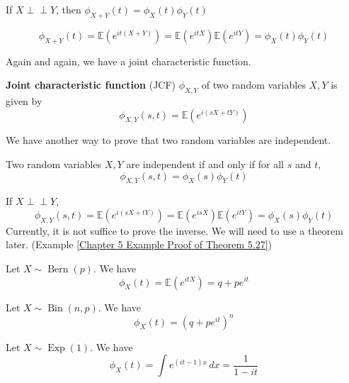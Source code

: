 \documentclass{huhtakm-template-book}
\newcommand{\independent}{\perp\!\!\!\perp}
\newcommand{\expect}{\mathbb{E}}
\DeclareMathOperator{\Bern}{Bern}
\DeclareMathOperator{\Bin}{Bin}
\DeclareMathOperator{\Exp}{Exp}
\begin{document}
\begin{thm}
    If $X\independent Y$, then $\phi_{X+Y}(t)=\phi_{X}(t)\phi_{Y}(t)$
\end{thm}
\begin{proofing}
    \begin{equation*}
        \phi_{X+Y}(t)=\expect(e^{it(X+Y)})=\expect(e^{itX})\expect(e^{itY})=\phi_{X}(t)\phi_{Y}(t)
    \end{equation*}
\end{proofing}
Again and again, we have a joint characteristic function.
\begin{defn}
    \textbf{Joint characteristic function} (JCF) $\phi_{X,Y}$ of two random variables $X,Y$ is given by
    \begin{equation*}
        \phi_{X,Y}(s,t)=\expect(e^{i(sX+tY)})
    \end{equation*}
\end{defn}
We have another way to prove that two random variables are independent.
\begin{thm}
    \label{Chapter 5 Theorem Independent via CF}
    Two random variables $X,Y$ are independent if and only if for all $s$ and $t$,
    \begin{equation*}
        \phi_{X,Y}(s,t)=\phi_{X}(s)\phi_{Y}(t)
    \end{equation*}
\end{thm}
\begin{proofing}
    If $X\independent Y$,
    \begin{equation*}
        \phi_{X,Y}(s,t)=\expect(e^{i(sX+tY)})=\expect(e^{isX})\expect(e^{itY})=\phi_{X}(s)\phi_{Y}(t)
    \end{equation*}
    Currently, it is not suffice to prove the inverse. We will need to use a theorem later. (Example \ref{Chapter 5 Example Proof of Theorem 5.27})
\end{proofing}
\begin{eg}
    Let $X\sim\Bern(p)$. We have
    \begin{equation*}
        \phi_{X}(t)=\expect(e^{itX})=q+pe^{it}
    \end{equation*}
\end{eg}
\begin{eg}
    Let $X\sim\Bin(n,p)$. We have
    \begin{equation*}
        \phi_{X}(t)=(q+pe^{it})^{n}
    \end{equation*}
\end{eg}
\begin{eg}
    Let $X\sim\Exp(1)$. We have
    \begin{equation*}
        \phi_{X}(t)=\int e^{(it-1)x}\,dx=\frac{1}{1-it}
    \end{equation*}
\end{eg}
\end{document}
